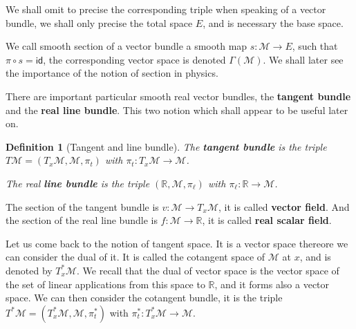 \documentclass[10pt]{book}
\newcommand{\id}{\mathsf{id}}
\newcommand{\Mcal}{\mathcal{M}}
\newcommand{\Rbb}{\mathbb{R}}
\theoremstyle{break}
\newtheorem{definition}{Definition}
\begin{document}
We shall omit to precise the corresponding triple when speaking of a vector bundle, we shall only precise the total space $E$, and is necessary the base space.


%


\bigskip


We call smooth section of a vector bundle a smooth map $s : \Mcal \to E$, such that $\pi \circ s = \id$, the corresponding vector space is denoted $\Gamma(\Mcal)$. We shall later see the importance of the notion of section in physics.



\bigskip


There are important particular smooth real vector bundles, the \textbf{tangent bundle} and the \textbf{real line bundle}. This two notion which shall appear to be useful later on.


\begin{definition}[Tangent and line bundle]
The \textbf{tangent bundle} is the triple $T\Mcal=(T_x\Mcal, \Mcal, \pi_t)$ with $\pi_t : T_x\Mcal \to \Mcal$. \par%
The real \textbf{line bundle} is the triple $(\Rbb, \Mcal, \pi_\ell)$ with $\pi_\ell : \Rbb \to \Mcal$. 
\end{definition}


The section of the tangent bundle is $v : \Mcal \to T_x\Mcal$, it is called \textbf{vector field}. And the section of the real line bundle is $f : \Mcal \to \Rbb$, it is called \textbf{real scalar field}.


\bigskip


Let us come back to the notion of tangent space. It is a vector space thereore we can consider the dual of it. It is called the cotangent space of $\Mcal$ at $x$, and is denoted by $T^\ast_x\Mcal$. We recall that the dual of vector space is the vector space of the set of linear applications from this space to $\Rbb$, and it forms also a vector space. We can then consider the cotangent bundle, it is the triple $T^\ast\Mcal=(T^\ast_x\Mcal, \Mcal, \pi^\ast_t)$ with $\pi^\ast_t : T^\ast_x\Mcal \to \Mcal$.
\end{document}
